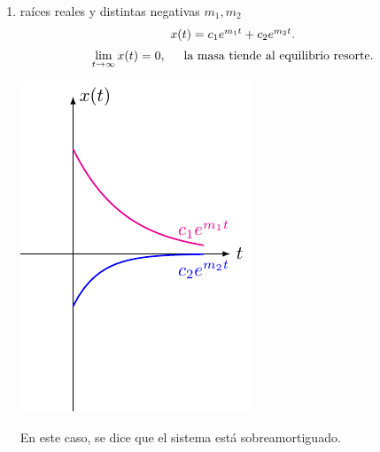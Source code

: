 \documentclass{beamer}
\begin{document}
\begin{frame}[t]
	\begin{block}{}
		\begin{enumerate}
			\item {} raíces reales y distintas negativas \(m_1,m_2\) 
				\[
					\begin{array}{c}
						x(t) = c_1e^{m_1t} + c_2e^{m_2t}. \\[2mm]
						\displaystyle\lim_{t\rightarrow \infty} x(t) =0, \hspace{5mm} \mbox{la masa tiende al equilibrio resorte.}
					\end{array}
				\]
				\begin{minipage}{0.4\linewidth}
					\includegraphics[width= 0.9 \linewidth]{IMAGENES/3/tikz.pdf}
				\end{minipage}\hspace{5mm}
				\begin{minipage}{0.5\linewidth}
					En este caso, se dice que el sistema está sobreamortiguado.
				\end{minipage}
		\end{enumerate}
	\end{block}
\end{frame}
\end{document}
